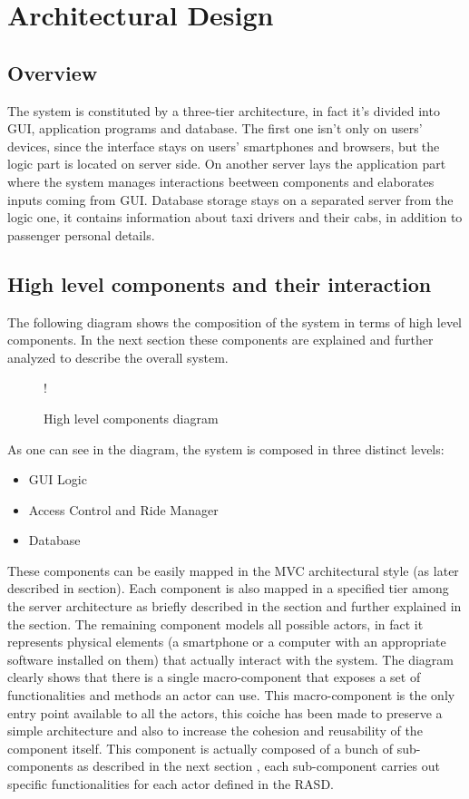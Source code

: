 \section{Architectural Design}
\subsection{Overview}
\label{sec:overview}
The system is constituted by a three-tier architecture, in fact it's divided into GUI, application programs and database. The first one isn't only on users' devices, since the interface stays on users' smartphones and browsers, but the logic part is located on server side. On another server lays the application part where the system manages interactions beetween components and elaborates inputs coming from GUI. Database storage stays on a separated server from the logic one, it contains information about taxi drivers and their cabs, in addition to passenger personal details.  
\subsection{High level components and their interaction}
\label{sec:high-level}
The following diagram shows the composition of the system in terms of high level components. \newline
In the next section these components are explained and further analyzed to describe the overall system.
\begin{figure}[H]
	\centering
	\resizebox{6in}
	{!}{}
	\caption{High level components diagram}
\end{figure}
As one can see in the diagram, the system is composed in three distinct levels:
\begin{itemize}
	\item GUI Logic
	\item Access Control and Ride Manager
	\item Database
\end{itemize}
These components can be easily mapped in the MVC architectural style (as later described in  section).
Each component is also mapped in a specified tier among the server architecture as briefly described in the  section and further explained in the  section.
The remaining component models all possible actors, in fact it represents physical elements (a smartphone or a computer with an appropriate software installed on them) that actually interact with the system. \newline
The diagram clearly shows that there is a single macro-component that exposes a set of functionalities and methods an actor can use. This macro-component is the only entry point available to all the actors, this coiche has been made to preserve a simple architecture and also to increase the cohesion and reusability of the component itself. \newline
This component is actually composed of a bunch of sub-components as described in the next section , each sub-component carries out specific functionalities for each actor defined in the RASD.
